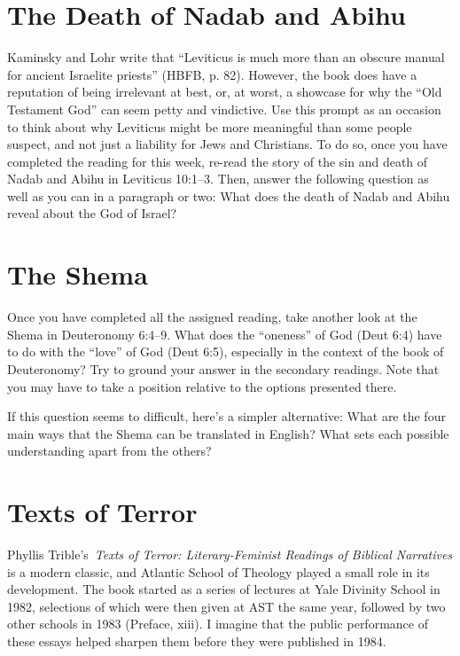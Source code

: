 \documentclass[12pt]{article}
\begin{document}
\section{The Death of Nadab and Abihu}

Kaminsky and Lohr write that “Leviticus is much more than an obscure manual for ancient Israelite priests” (HBFB, p. 82). However, the book does have a reputation of being irrelevant at best, or, at worst, a showcase for why the “Old Testament God” can seem petty and vindictive. Use this prompt as an occasion to think about why Leviticus might be more meaningful than some people suspect, and not just a liability for Jews and Christians. To do so, once you have completed the reading for this week, re-read the story of the sin and death of Nadab and Abihu in Leviticus 10:1–3. Then, answer the following question as well as you can in a paragraph or two: What does the death of Nadab and Abihu reveal about the God of Israel?


\section{The Shema}

Once you have completed all the assigned reading, take another look at the Shema in Deuteronomy 6:4–9. What does the “oneness” of God (Deut 6:4) have to do with the “love” of God (Deut 6:5), especially in the context of the book of Deuteronomy? Try to ground your answer in the secondary readings. Note that you may have to take a position relative to the options presented there.

If this question seems to difficult, here's a simpler alternative: What are the four main ways that the Shema can be translated in English? What sets each possible understanding apart from the others?

\section{Texts of Terror}

Phyllis Trible’s \emph{Texts of Terror: Literary-Feminist Readings of Biblical Narratives} is a modern classic, and Atlantic School of Theology played a small role in its development. The book started as a series of lectures at Yale Divinity School in 1982, selections of which were then given at AST the same year, followed by two other schools in 1983 (Preface, xiii). I imagine that the public performance of these essays helped sharpen them before they were published in 1984.
\end{document}
